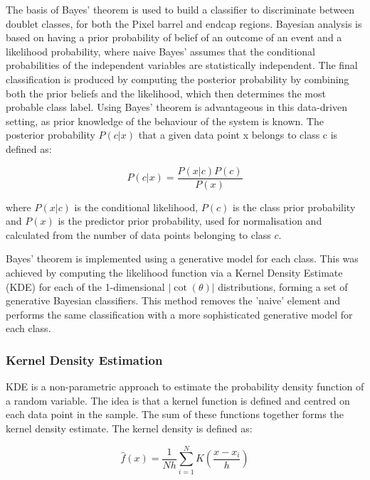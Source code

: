 The basis of Bayes’ theorem \cite{naive-bayes} is used to build a classifier to discriminate between doublet classes, for both the Pixel barrel and endcap regions. Bayesian analysis is based on having a prior probability of belief of an outcome of an event and a likelihood probability, where naive Bayes’ assumes that the conditional probabilities of the independent variables are statistically independent. The final classification is produced by computing the posterior probability by combining both the prior beliefs and the likelihood, which then determines the most probable class label. Using Bayes’ theorem is advantageous in this data-driven setting, as prior knowledge of the behaviour of the system is known. The posterior probability $P(c|x)$ that a given data point x belongs to class c is defined as:

\begin{equation} \label{naive-bayes}
    P(c|x) = \frac{P(x|c)P(c)}{P(x)}
\end{equation}

where $P(x|c)$ is the conditional likelihood, $P(c)$ is the class prior probability and $P(x)$ is the predictor prior probability, used for normalisation and calculated from the number of data points belonging to class $c$.

Bayes' theorem is implemented using a generative model for each class. This was achieved by computing the likelihood function via a Kernel Density Estimate (KDE) for each of the 1-dimensional $|\cot(\theta)|$ distributions, forming a set of generative Bayesian classifiers. This method removes the 'naive' element and performs the same classification with a more sophisticated generative model for each class.

\subsubsection{Kernel Density Estimation}

KDE is a non-parametric approach to estimate the probability density function of a random variable. The idea is that a kernel function is defined and centred on each data point in the sample. The sum of these functions together forms the kernel density estimate. The kernel density is defined as:
    
\begin{equation} \label{eq2}
    \hat{f}(x) = \frac{1}{Nh}  \sum_{i=1}^{N} K \left( \frac{x - x_i}{h} \right)
\end{equation}

